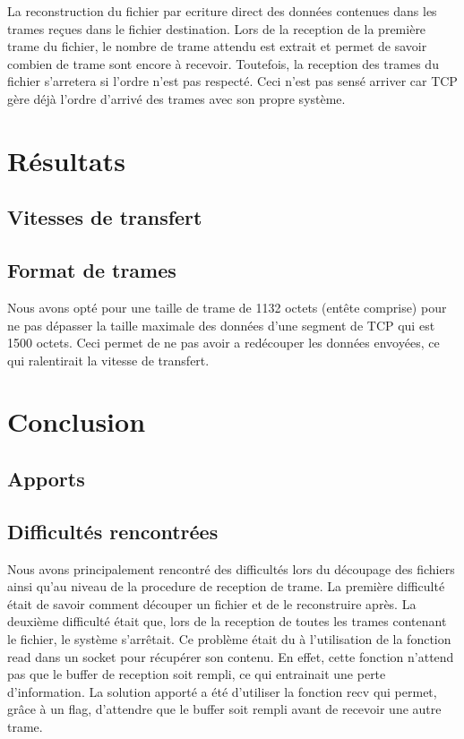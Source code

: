 \documentclass[a4paper, 11pt, french]{report}
\begin{document}
			
			La reconstruction du fichier par ecriture direct des données contenues dans les trames reçues dans le fichier destination. Lors de la reception de la première trame du fichier, le nombre de trame attendu est extrait et permet de savoir combien de trame sont encore à recevoir. 
			Toutefois, la reception des trames du fichier s'arretera si l'ordre n'est pas respecté. Ceci n'est pas sensé arriver car TCP gère déjà l'ordre d'arrivé des trames avec son propre système.
			
\chapter{Résultats}
	\section{Vitesses de transfert}  %
	\section{Format de trames} %
	Nous avons opté pour une taille de trame de 1132 octets (entête comprise) pour ne pas dépasser la taille maximale des données d'une segment de TCP qui est 1500 octets. Ceci permet de ne pas avoir a redécouper les données envoyées, ce qui ralentirait la vitesse de transfert.
	

\chapter{Conclusion}
	\section{Apports} %
	\section{Difficultés rencontrées} %
	Nous avons principalement rencontré des difficultés lors du découpage des fichiers ainsi qu'au niveau de la procedure de reception de trame. 
	La première difficulté était de savoir comment découper un fichier et de le reconstruire après.
	La deuxième difficulté était que, lors de la reception de toutes les trames contenant le fichier, le système s'arrêtait. Ce problème était du à l'utilisation de la fonction read dans un socket pour récupérer son contenu. En effet, cette fonction n'attend pas que le buffer de reception soit rempli, ce qui entrainait une perte d'information. La solution apporté a été d'utiliser la fonction recv qui permet, grâce à un flag, d'attendre que le buffer soit rempli avant de recevoir une autre trame. 
\end{document}
